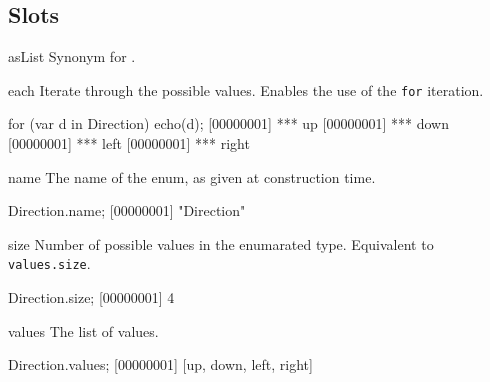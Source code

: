 \subsection{Slots}
\begin{urbiscriptapi}

\item[asList]
  Synonym for .

\item[each]
  Iterate through the possible values. Enables the use of the
  \lstinline{for} iteration.
  \begin{urbiscript}
for (var d in Direction)
  echo(d);
[00000001] *** up
[00000001] *** down
[00000001] *** left
[00000001] *** right
  \end{urbiscript}

\item[name]
  The name of the enum, as given at construction time.
  \begin{urbiscript}
Direction.name;
[00000001] "Direction"
  \end{urbiscript}

\item[size]
  Number of possible values in the enumarated type. Equivalent to
  \lstinline{values.size}.
  \begin{urbiscript}
Direction.size;
[00000001] 4
  \end{urbiscript}

\item[values]
  The list of values.
  \begin{urbiscript}
Direction.values;
[00000001] [up, down, left, right]
  \end{urbiscript}

\end{urbiscriptapi}


